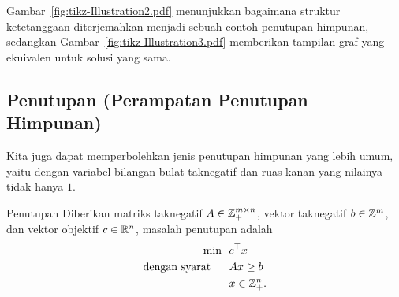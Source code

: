 Gambar~\ref{fig:tikz-Illustration2.pdf} menunjukkan bagaimana struktur ketetanggaan diterjemahkan menjadi sebuah contoh penutupan himpunan, sedangkan Gambar~\ref{fig:tikz-Illustration3.pdf} memberikan tampilan graf yang ekuivalen untuk solusi yang sama.







\subsection{Penutupan (Perampatan Penutupan Himpunan)}
Kita juga dapat memperbolehkan jenis penutupan himpunan yang lebih umum, yaitu dengan variabel bilangan bulat taknegatif dan ruas kanan yang nilainya tidak hanya $1$.
\begin{general}{Penutupan}{\npcomplete}
\label{general:covering}
Diberikan matriks taknegatif $A \in {\mathbb{Z}}_+^{m \times n}$, vektor taknegatif $b \in {\mathbb{Z}}^m$, dan vektor objektif $c \in {\mathbb{R}}^n$, masalah penutupan adalah
\begin{equation}
\begin{split}
\min \ \ & c^\top x\\
\mbox{dengan syarat}\quad \ \ & Ax \geq b \\
& x \in{\mathbb{Z}}^n_+.
\end{split}
\end{equation}
\end{general}






